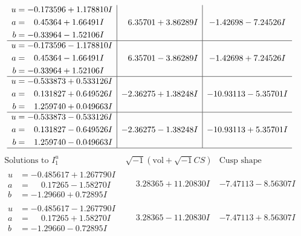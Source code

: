 \documentclass[1p]{elsarticle_modified}
\theoremstyle{definition}
\newcommand{\I}{\sqrt{-1}}
\begin{document}
$$\begin{array}{c|c|c}
\begin{aligned}
u &= -0.173596 + 1.178810 I \\
a &= \phantom{-}0.45364 + 1.66491 I \\
b &= -0.33964 - 1.52106 I\end{aligned}
 & \phantom{-}6.35701 + 3.86289 I & -1.42698 - 7.24526 I \\ \hline\begin{aligned}
u &= -0.173596 - 1.178810 I \\
a &= \phantom{-}0.45364 - 1.66491 I \\
b &= -0.33964 + 1.52106 I\end{aligned}
 & \phantom{-}6.35701 - 3.86289 I & -1.42698 + 7.24526 I \\ \hline\begin{aligned}
u &= -0.533873 + 0.533126 I \\
a &= \phantom{-}0.131827 + 0.649526 I \\
b &= \phantom{-}1.259740 + 0.049663 I\end{aligned}
 & -2.36275 + 1.38248 I & -10.93113 - 5.35701 I \\ \hline\begin{aligned}
u &= -0.533873 - 0.533126 I \\
a &= \phantom{-}0.131827 - 0.649526 I \\
b &= \phantom{-}1.259740 - 0.049663 I\end{aligned}
 & -2.36275 - 1.38248 I & -10.93113 + 5.35701 I\\
 \hline 
 \end{array}$$\newpage$$\begin{array}{c|c|c}  
\text{Solutions to }I^u_{1}& \I (\text{vol} + \sqrt{-1}CS) & \text{Cusp shape}\\
 \hline 
\begin{aligned}
u &= -0.485617 + 1.267790 I \\
a &= \phantom{-}0.17265 - 1.58270 I \\
b &= -1.29660 + 0.72895 I\end{aligned}
 & \phantom{-}3.28365 + 11.20830 I & -7.47113 - 8.56307 I \\ \hline\begin{aligned}
u &= -0.485617 - 1.267790 I \\
a &= \phantom{-}0.17265 + 1.58270 I \\
b &= -1.29660 - 0.72895 I\end{aligned}
 & \phantom{-}3.28365 - 11.20830 I & -7.47113 + 8.56307 I \\ \hline\begin{aligned}

\end{aligned}
\end{array}$$
\end{document}
